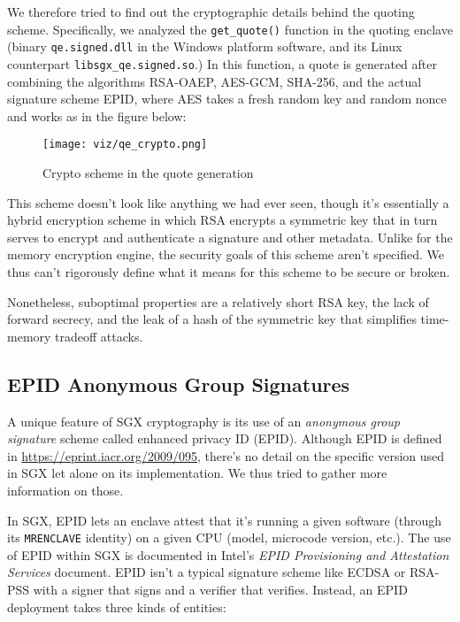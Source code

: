 \documentclass[]{article}
\begin{document}
We therefore tried to find out the cryptographic details behind the
quoting scheme. Specifically, we analyzed the \texttt{get\_quote()}
function in the quoting enclave (binary \texttt{qe.signed.dll} in the
Windows platform software, and its Linux counterpart
\texttt{libsgx\_qe.signed.so}.) In this function, a quote is generated
after combining the algorithms RSA-OAEP, AES-GCM, SHA-256, and the
actual signature scheme EPID, where AES takes a fresh random key and
random nonce and works as in the figure below:

\begin{figure}[htbp]
\centering
\texttt{[image: viz/qe\_crypto.png]}
\caption{Crypto scheme in the quote generation}
\end{figure}

This scheme doesn't look like anything we had ever seen, though it's
essentially a hybrid encryption scheme in which RSA encrypts a symmetric
key that in turn serves to encrypt and authenticate a signature and
other metadata. Unlike for the memory encryption engine, the security
goals of this scheme aren't specified. We thus can't rigorously define
what it means for this scheme to be secure or broken.

Nonetheless, suboptimal properties are a relatively short RSA key, the
lack of forward secrecy, and the leak of a hash of the symmetric key
that simplifies time-memory tradeoff attacks.

\subsection{EPID Anonymous Group
Signatures}\label{epid-anonymous-group-signatures}

A unique feature of SGX cryptography is its use of an \emph{anonymous
group signature} scheme called enhanced privacy ID (EPID). Although EPID
is defined in \url{https://eprint.iacr.org/2009/095}, there's no detail
on the specific version used in SGX let alone on its implementation. We
thus tried to gather more information on those.

In SGX, EPID lets an enclave attest that it's running a given software
(through its \texttt{MRENCLAVE} identity) on a given CPU (model,
microcode version, etc.). The use of EPID within SGX is documented in
Intel's \emph{EPID Provisioning and Attestation Services} document. EPID
isn't a typical signature scheme like ECDSA or RSA-PSS with a signer
that signs and a verifier that verifies. Instead, an EPID deployment
takes three kinds of entities:
\end{document}
